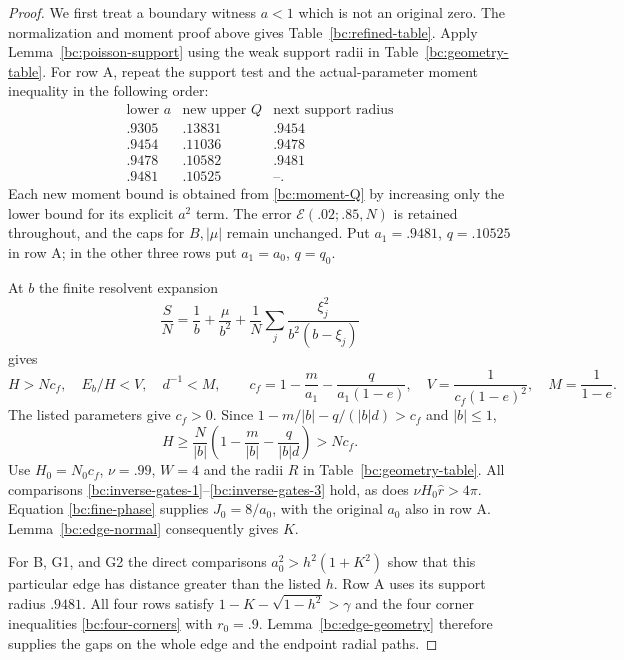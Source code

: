 \begin{proof}
We first treat a boundary witness $a<1$ which is not an original
zero.  The normalization and moment proof above gives
Table~\ref{bc:refined-table}.  Apply Lemma~\ref{bc:poisson-support}
using the weak support radii in Table~\ref{bc:geometry-table}.
For row A, repeat the support test and the actual-parameter moment
inequality in the following order:
\begin{equation}\label{bc:feedback}
\begin{array}{c|c|c}
 \text{lower }a&\text{new upper }Q&\text{next support radius}\\ \hline
 .9305&.13831&.9454\\
 .9454&.11036&.9478\\
 .9478&.10582&.9481\\
 .9481&.10525&\text{--}.
\end{array}
\end{equation}
Each new moment bound is obtained from \eqref{bc:moment-Q} by
increasing only the lower bound for its explicit $a^2$ term.
The error $\mathcal E(.02;.85,N)$ is retained throughout, and the
caps for $B,|\mu|$ remain unchanged.
Put $a_1=.9481$, $q=.10525$ in row A;
in the other three rows put $a_1=a_0$, $q=q_0$.

At $b$ the finite resolvent expansion
\[
 \frac SN=\frac1b+\frac{\mu}{b^2}
                  +\frac1N\sum_j\frac{\xi_j^2}{b^2(b-\xi_j)}
\]
gives
\begin{equation}\label{bc:moment-field}
 H>Nc_f,\quad E_b/H<V,\quad d^{-1}<M,\qquad
 c_f=1-\frac m{a_1}-\frac q{a_1(1-e)},\quad
 V=\frac1{c_f(1-e)^2},\quad M=\frac1{1-e}.
\end{equation}
The listed parameters give $c_f>0$.  Since
$1-m/|b|-q/(|b|d)>c_f$ and $|b|\leq1$,
\[
 H\geq\frac N{|b|}\left(1-\frac m{|b|}-\frac q{|b|d}\right)>Nc_f.
\]
Use $H_0=N_0c_f$, $\nu=.99$, $W=4$ and the radii $R$ in
Table~\ref{bc:geometry-table}.  All comparisons
\eqref{bc:inverse-gates-1}--\eqref{bc:inverse-gates-3} hold, as does
$\nu H_0\widehat r>4\pi$.  Equation \eqref{bc:fine-phase} supplies
$J_0=8/a_0$, with the original $a_0$ also in row A.
Lemma~\ref{bc:edge-normal} consequently gives $K$.

For B, G1, and G2 the direct comparisons
$a_0^2>h^2(1+K^2)$ show that this particular edge has distance
greater than the listed $h$.  Row A uses its support radius $.9481$.
All four rows satisfy
$1-K-\sqrt{1-h^2}>\gamma$ and the four corner inequalities
\eqref{bc:four-corners} with $r_0=.9$.
Lemma~\ref{bc:edge-geometry} therefore supplies the gaps on the
whole edge and the endpoint radial paths.


\end{proof}
